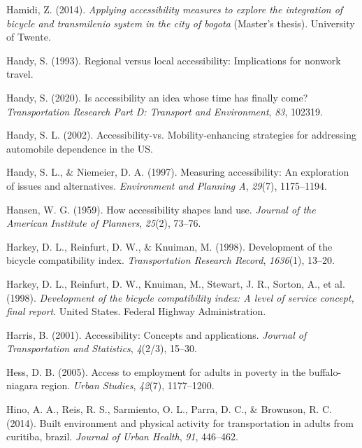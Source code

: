 \documentclass[12pt,twoside]{reedthesis}
\newlength{\cslhangindent}
\newenvironment{CSLReferences}[2] %
 {%
  \setlength{\parindent}{0pt}
  \ifodd #1 \everypar{\setlength{\hangindent}{\cslhangindent}}\ignorespaces\fi
  \ifnum #2 > 0
  \setlength{\parskip}{#2\baselineskip}
  \fi
 }%
 {}
\begin{document}
\begin{CSLReferences}{1}{0}
\leavevmode{}%
Hamidi, Z. (2014). \emph{Applying accessibility measures to explore the integration of bicycle and transmilenio system in the city of bogota} (Master's thesis). University of Twente.

\leavevmode{}%
Handy, S. (1993). Regional versus local accessibility: Implications for nonwork travel.

\leavevmode{}%
Handy, S. (2020). Is accessibility an idea whose time has finally come? \emph{Transportation Research Part D: Transport and Environment}, \emph{83}, 102319.

\leavevmode{}%
Handy, S. L. (2002). Accessibility-vs. Mobility-enhancing strategies for addressing automobile dependence in the US.

\leavevmode{}%
Handy, S. L., \& Niemeier, D. A. (1997). Measuring accessibility: An exploration of issues and alternatives. \emph{Environment and Planning A}, \emph{29}(7), 1175--1194.

\leavevmode{}%
Hansen, W. G. (1959). How accessibility shapes land use. \emph{Journal of the American Institute of Planners}, \emph{25}(2), 73--76.

\leavevmode{}%
Harkey, D. L., Reinfurt, D. W., \& Knuiman, M. (1998). Development of the bicycle compatibility index. \emph{Transportation Research Record}, \emph{1636}(1), 13--20.

\leavevmode{}%
Harkey, D. L., Reinfurt, D. W., Knuiman, M., Stewart, J. R., Sorton, A., et al. (1998). \emph{Development of the bicycle compatibility index: A level of service concept, final report}. United States. Federal Highway Administration.

\leavevmode{}%
Harris, B. (2001). Accessibility: Concepts and applications. \emph{Journal of Transportation and Statistics}, \emph{4}(2/3), 15--30.

\leavevmode{}%
Hess, D. B. (2005). Access to employment for adults in poverty in the buffalo-niagara region. \emph{Urban Studies}, \emph{42}(7), 1177--1200.

\leavevmode{}%
Hino, A. A., Reis, R. S., Sarmiento, O. L., Parra, D. C., \& Brownson, R. C. (2014). Built environment and physical activity for transportation in adults from curitiba, brazil. \emph{Journal of Urban Health}, \emph{91}, 446--462.


\end{CSLReferences}
\end{document}
